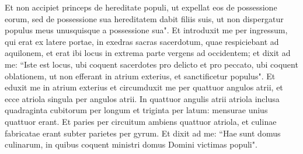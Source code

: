 \begin{biblechapter}
\verse Et non accipiet princeps de hereditate populi, ut expellat eos de possessione eorum, sed de possessione sua hereditatem dabit filiis suis, ut non dispergatur populus meus unusquisque a possessione sua". 
\verse Et introduxit me per ingressum, qui erat ex latere portae, in exedras sacras sacerdotum, quae respiciebant ad aquilonem, et erat ibi locus in extrema parte vergens ad occidentem; 
\verse et dixit ad me: “Iste est locus, ubi coquent sacerdotes pro delicto et pro peccato, ubi coquent oblationem, ut non efferant in atrium exterius, et sanctificetur populus". 
\verse Et eduxit me in atrium exterius et circumduxit me per quattuor angulos atrii, et ecce atriola singula per angulos atrii. 
\verse In quattuor angulis atrii atriola inclusa quadraginta cubitorum per longum et triginta per latum: mensurae unius quattuor erant.  
\verse Et paries per circuitum ambiens quattuor atriola, et culinae fabricatae erant subter parietes per gyrum. 
\verse Et dixit ad me: “Hae sunt domus culinarum, in quibus coquent ministri domus Domini victimas populi". 
\end{biblechapter}

